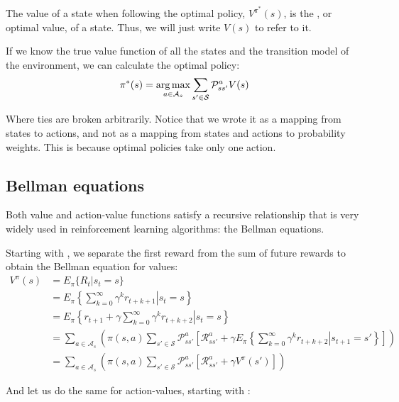The value of a state when following the optimal policy, $V^{\pi^*}(s)$, is the
, or optimal value, of a state. Thus, we will just write $V(s)$ to refer to it.

If we know the true value function of all the states and the transition model of
the environment, we can calculate the optimal policy:
\begin{equation}
  \pi^*(s) = \argmax_{a\in\mathcal{A}_s} \sum_{s'\in\mathcal{S}}\mathcal{P}^a_{ss'}V(s)
  \label{eq:optimal-policy-value}
\end{equation}

Where ties are broken arbitrarily. Notice that we wrote it as a mapping from
states to actions, and not as a mapping from states and actions to probability
weights. This is because optimal policies take only one action.

\citep[Subsection~17.1.2]{russell2009aima}

\subsection{Bellman equations}
Both value and action-value functions satisfy a recursive relationship that is
very widely used in reinforcement learning algorithms: the Bellman equations.

Starting with , we separate the first reward
from the sum of future rewards to obtain the Bellman equation for values:
\begin{equation}
\begin{split}
  V^\pi(s) & = E_\pi \lbrace R_t | s_t = s \rbrace \\
  & = E_\pi \left\{ \left. \sum_{k=0}^\infty \gamma^kr_{t+k+1} \right| s_t = s \right\} \\
  & = E_\pi \left\{ \left. r_{t+1} + \gamma\sum_{k=0}^\infty \gamma^kr_{t+k+2} \right| s_t = s \right\} \\
  & = \sum_{a\in\mathcal{A}_s} \left( \pi(s, a) \sum_{s' \in \mathcal{S}}\mathcal{P}^a_{ss'}
\left[\mathcal{R}^a_{ss'} + \gamma E_\pi \left\{ \left. \sum_{k=0}^\infty
\gamma^kr_{t+k+2} \right| s_{t+1} = s' \right\} \right] \right) \\
  & = \sum_{a\in\mathcal{A}_s} \left( \pi(s, a) \sum_{s' \in \mathcal{S}}\mathcal{P}^a_{ss'}
\left[\mathcal{R}^a_{ss'} + \gamma V^\pi(s') \right] \right)
\end{split}
\label{eq:bellman-v}
\end{equation}

And let us do the same for action-values, starting with
:

